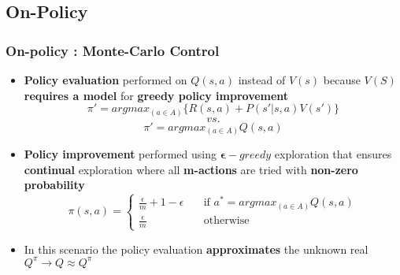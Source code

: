 \documentclass[12pt]{article} %
\begin{document}
\subsection{On-Policy}

\subsubsection{On-policy : Monte-Carlo Control}
\begin{itemize}
\item \textbf{Policy evaluation} performed on $Q(s,a)$ instead of $V(s)$ because $V(S)$ \textbf{requires a model} for \textbf{greedy policy improvement}
$$ \pi' = argmax_{(a \in A )}\{ R(s,a) + P(s'|s,a)V(s')\}$$
$$ vs.$$
$$ \pi' = argmax_{(a \in A)} Q(s,a)$$

\item \textbf{Policy improvement} performed using $\bm{\epsilon}-greedy$ exploration that ensures \textbf{continual} exploration where all \textbf{m-actions} are tried with \textbf{non-zero probability}
$$ \pi(s,a) =
\begin{cases}
\frac{\epsilon}{m}+1 - \epsilon & \quad \text{if } a^* =argmax_{(a \in A)}Q(s,a) \\
\frac{\epsilon}{m} & \quad \text{otherwise}
\end{cases}
$$

\begin{center}
\end{center}
 
\item In this scenario the policy evaluation \textbf{approximates} the unknown real $Q^{\pi} \rightarrow Q \approx Q^{\pi}$


\end{itemize}
\end{document}
